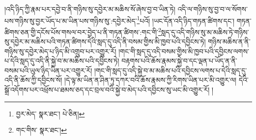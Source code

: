།འདི་ཉིད་ཀྱི་རྣམ་པར་དབྱེ་བ་ནི་གཉིས་སུ་དབྱེར་མ་མཆིས་སོ་ཞེས་བྱ་བ་ཡིན་ཏེ། འདི་ལ་གཉིས་སུ་བྱ་བ་ལ་སོགས་པས་གཉིས་སུ་བྱར་ཡོད་པ་མ་ཡིན་པས་གཉིས་སུ་:དབྱེར་མེད་\footnote{བྱར་མེད་  སྣར་ཐང་།  པེ་ཅིན། }པའོ། །ཡང་དོན་འདི་ཉིད་གཏན་ཚིགས་དང་། གཏན་ཚིགས་ཅན་གྱི་དངོས་པོས་གསལ་བར་བྱེད་པ་ནི་གཏན་ཚིགས་:གང་གི་\footnote{གང་གིས་  སྣར་ཐང་། }སླད་དུ་འདི་གཉིས་སུ་མ་མཆིས་ཏེ་གཉིས་སུ་དབྱེར་མ་མཆིས་པའི་གཏན་ཚིགས་དེའི་སླད་དུ་འདི་ནི་བསམ་གྱིས་མི་ཁྱབ་པའི་དབྱིངས་ཏེ། གཉིས་མཆིས་ན་ནི་གཉིས་སུ་དབྱེར་མེད་པ་ཉིད་མི་འགྲུབ་པར་འགྱུར་རོ། །གང་གི་སླད་དུ་འདི་བསམ་གྱིས་མི་ཁྱབ་པའི་དབྱིངས་ལགས་པ་དེའི་སླད་དུ་འདི་ནི་སྐྱེ་བ་མ་མཆིས་པའི་དབྱིངས་ཏེ། བརྟགས་པའི་ཆོས་རྣམས་སྐྱེ་བ་དང་ལྡན་པ་ཡོད་ན་ནི་བསམ་པའི་ཡུལ་ཉིད་ཡིན་པར་འགྱུར་རོ། །གང་གི་སླད་དུ་འདི་སྐྱེ་བ་མ་མཆིས་པའི་དབྱིངས་ལགས་པ་དེའི་སླད་དུ་འདི་ནི་ཆོས་ཀྱི་དབྱིངས་སོ། །དེ་ལྟ་མ་ཡིན་ན་ཤིན་ཏུ་དཀར་བའི་ཆོས་རྣམས་ཀྱི་རིགས་ཡིན་པར་མི་འགྱུར་ལ། དེའི་སྒྲོ་འདོགས་པར་འཕྲོས་པ་ཐམས་ཅད་དང་བྲལ་བའི་སྐྱེ་བ་མེད་པའི་དབྱིངས་སུ་ཡང་མི་འགྱུར་རོ། །
